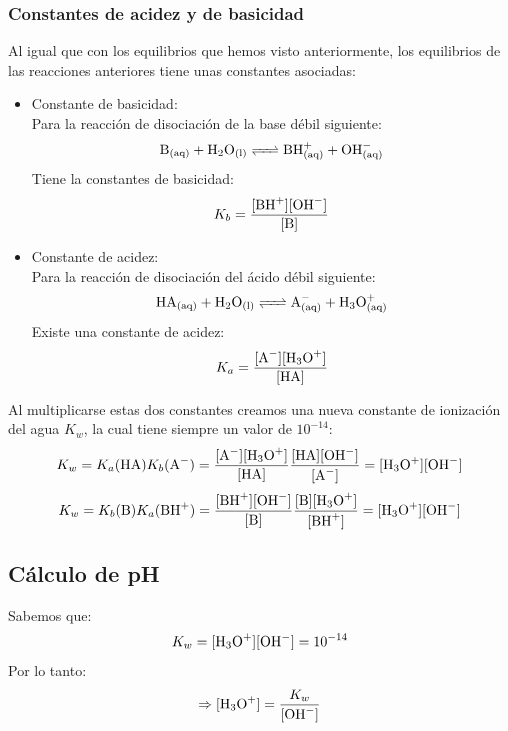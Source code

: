\documentclass[arial,a4paper,print]{article}
\begin{document}
\subsubsection{Constantes de acidez y de basicidad}
Al igual que con los equilibrios que hemos visto anteriormente, los equilibrios de las reacciones anteriores tiene unas constantes asociadas:
\begin{itemize}
\item Constante de basicidad:\\
Para la reacción de disociación de la base débil siguiente:
\begin{equation*}
	\ce{B_{(aq)} + H2O_{(l)} <=> BH^+_{(aq)} + OH^-_{(aq)}}
\end{equation*}
Tiene la constantes de basicidad:
\begin{equation*}
	K_{b} = \frac{[\ce{BH}^{+}][\ce{OH}^{-}]}{[\ce{B}]}
\end{equation*}

\item Constante de acidez:\\
Para la reacción de disociación del ácido débil siguiente:
\begin{equation*}
	\ce{HA_{(aq)} + H2O_{(l)} <=> A^-_{(aq)} + H3O^+_{(aq)}}
\end{equation*}
Existe una constante de acidez:
\begin{equation*}
	K_{a} = \frac{[\ce{A^-}][\ce{H3O^+}]}{[\ce{HA}]}
\end{equation*}

\end{itemize}

Al multiplicarse estas dos constantes creamos una nueva constante de ionización del agua $K_w$, la cual tiene siempre un valor de $10^{-14}$:
\begin{equation*}
	K_{w} = K_{a}(\ce{HA})K_{b}(\ce{A^-}) = \frac{\ce{[A^-][H3O^+]}}{\ce{[HA]}}\frac{\ce{[HA][OH^-]}}{\ce{[A^-]}} = \ce{[H3O^+][OH^-]}
\end{equation*}
\begin{equation*}
	K_{w} = K_{b}(\ce{B})K_{a}(\ce{BH^+}) = \frac{\ce{[BH^+]}\ce{[OH^-]}}{\ce{[B]}} \frac{\ce{[B]}\ce{[H3O^+]}}{\ce{[BH^+]}} = \ce{[H3O^+][OH^-]}
\end{equation*}

\subsection{Cálculo de pH}
Sabemos que:
\begin{equation*}
	K_{w} = \ce{[H3O^+][OH^-]} = 10^{-14}
\end{equation*}
Por lo tanto:
\begin{equation*}
	\Rightarrow [\ce{H3O^+}] = \frac{K_{w}}{\ce{[OH^-]}}
\end{equation*}
\end{document}
